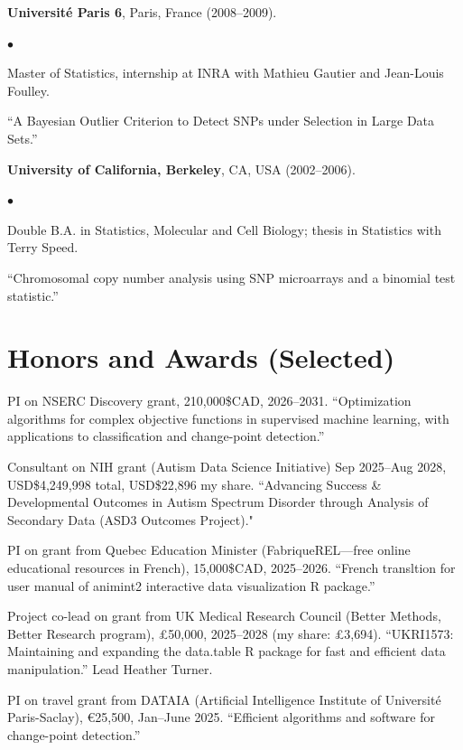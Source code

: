 \documentclass[margin,line]{res}
\newenvironment{list2}{
  \begin{list}{$\bullet$}{%
      \setlength{\itemsep}{0in}
      \setlength{\parsep}{0in} \setlength{\parskip}{0in}
      \setlength{\topsep}{0in} \setlength{\partopsep}{0in} 
      \setlength{\leftmargin}{0.2in}}}{\end{list}}
\begin{document}
\begin{resume}
{\bf Universit\'e Paris 6}, Paris, France (2008--2009).\\
\vspace*{-.1in}
\begin{list2}
\item[] Master of Statistics, internship at INRA with Mathieu Gautier and Jean-Louis Foulley.
\item[] ``A Bayesian Outlier Criterion to Detect SNPs under Selection in Large Data Sets.''
\end{list2}

{\bf University of California, Berkeley}, CA, USA (2002--2006).\\
\vspace*{-.1in}
\begin{list2}
\item[] Double B.A. in Statistics, Molecular and Cell Biology; thesis in Statistics with Terry Speed.
\item[] ``Chromosomal copy number analysis using SNP microarrays and a binomial test statistic.'' 
\end{list2}

\section{\sc Honors and Awards (Selected)}

PI on NSERC Discovery grant, 210,000\$CAD, 2026--2031. ``Optimization algorithms for complex objective functions in supervised machine learning, with applications to classification and change-point detection.''

Consultant on NIH grant (Autism Data Science Initiative) Sep 2025--Aug 2028, USD\$4,249,998 total, USD\$22,896 my share. ``Advancing Success \& Developmental Outcomes in Autism Spectrum Disorder through Analysis of Secondary Data (ASD3 Outcomes Project)."

PI on grant from Quebec Education Minister (FabriqueREL---free online
educational resources in French), 15,000\$CAD, 2025--2026. ``French
transltion for user manual of animint2 interactive data visualization
R package.''

Project co-lead on grant from UK Medical Research Council (Better
Methods, Better Research program), £50,000, 2025--2028 (my share:
£3,694). ``UKRI1573: Maintaining and expanding the data.table R
package for fast and efficient data manipulation.'' Lead Heather
Turner.

PI on travel grant from DATAIA (Artificial Intelligence Institute of
Université Paris-Saclay), €25,500, Jan--June 2025. ``Efficient algorithms and software for change-point detection.''


\end{resume}
\end{document}
